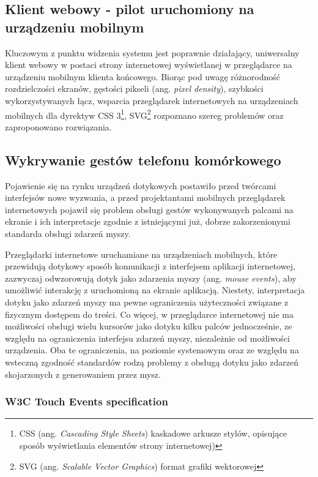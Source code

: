 \subsection{Klient webowy - pilot uruchomiony na urządzeniu mobilnym}

Kluczowym z punktu widzenia systemu jest poprawnie działający, uniwersalny klient webowy w postaci strony internetowej wyświetlanej w przeglądarce na urządzeniu mobilnym klienta końcowego. Biorąc pod uwagę różnorodność rozdzielczości ekranów, gęstości pikseli (ang. \emph{pixel density}), szybkości wykorzystywanych łącz, wsparcia przeglądarek internetowych na urządzeniach mobilnych dla dyrektyw CSS 3\footnote{CSS (ang. \emph{Cascading Style Sheets}) kaskadowe arkusze stylów, opisujące sposób wyświetlania elementów strony internetowej)}, SVG\footnote{SVG (ang. \emph{Scalable Vector Graphics}) format grafiki wektorowej} rozpoznano szereg problemów oraz zaproponowano rozwiązania.

\subsection{Wykrywanie gestów telefonu komórkowego}
\label{sub:touch-detection}

Pojawienie się na rynku urządzeń dotykowych postawiło przed twórcami interfejsów nowe wyzwania, a przed projektantami mobilnych przeglądarek internetowych pojawił się problem obsługi gestów wykonywanych palcami na ekranie i ich interpretacje zgodnie z istniejącymi już, dobrze zakorzenionymi standarda obsługi zdarzeń myszy.

Przeglądarki internetowe uruchamiane na urządzeniach mobilnych, które przewidują dotykowy sposób komunikacji z interfejsem aplikacji internetowej, zazwyczaj odwzorowują dotyk jako zdarzenia myszy (ang. \emph{mouse events}), aby umożliwić interakcję z uruchomioną na ekranie aplikacją. Niestety, interpretacja dotyku jako zdarzeń myszy ma pewne ograniczenia użyteczności związane z fizycznym dostępem do treści. Co więcej, w przeglądarce internetowej nie ma możliwości obsługi wielu kursorów jako dotyku kilku palców jednocześnie, ze względu na ograniczenia interfejsu zdarzeń myszy, niezależnie od możliwości urządzenia. Oba te ograniczenia, na poziomie systemowym oraz ze względu na wsteczną zgodność standardów rodzą problemy z obsługą dotyku jako zdarzeń skojarzonych z generowaniem przez mysz.

\subsubsection{W3C Touch Events specification}

